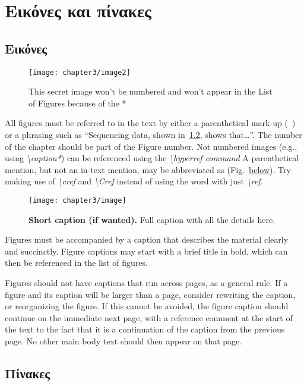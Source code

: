 \chapter{Εικόνες και πίνακες}\label{ch:3}

\section{Εικόνες}
\begin{figure}[H]
\center%
\texttt{[image: chapter3/image2]}
\caption*{This secret image won't be numbered and won't appear in the List of Figures because of the *}\label{fig:2}
\end{figure}
All figures must be referred to in the text by either a parenthetical mark-up (~) or a phrasing such as “Sequencing data, shown in~\cref{fig:1}, shows that\ldots''. The number of the chapter should be part of the Figure number. Not numbered images (e.g., using \textit{\textbackslash{caption*}}) can be referenced using the \textit{\textbackslash{hyperref command}}
A parenthetical mention, but not an in-text mention, may be abbreviated as (Fig.~\hyperref[fig:2]{below}). Try making use of \textit{\textbackslash{cref}} and \textit{\textbackslash{Cref}} instead of using the word \textit{} with just \textit{\textbackslash{ref}}.

\begin{figure}
\center%
\texttt{[image: chapter3/image]}
\caption[Short caption for List of Figures]{{\bfseries Short caption (if wanted).} Full caption with all the details here.}\label{fig:1}
\end{figure}
Figures must be accompanied by a caption that describes the material clearly and succinctly.
Figure captions may start with a brief title in bold, which can then be referenced in the list of figures.

Figures should not have captions that run across pages, as a general rule.
If a figure and its caption will be larger than a page, consider rewriting the caption, or reorganizing the figure.
If this cannot be avoided, the figure caption should continue on the immediate next page, with a reference comment at the start of the text to the fact that it is a continuation of the caption from the previous page.
No other main body text should then appear on that page.
\section{Πίνακες}

